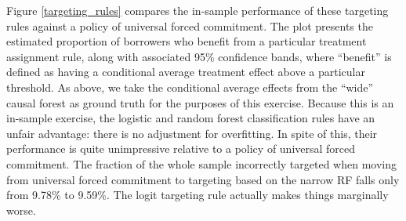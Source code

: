 \begin{figure}[H]

\end{figure}
\vspace{.1in}

Figure \ref{targeting_rules} compares the in-sample performance of these targeting rules against a policy of universal forced commitment. The plot presents the estimated proportion of borrowers who benefit from a particular treatment assignment rule, along with associated 95\% confidence bands, where ``benefit'' is defined as having a conditional average treatment effect above a particular threshold. As above, we take the conditional average effects from the ``wide'' causal forest as ground truth for the purposes of this exercise. Because this is an in-sample exercise, the logistic and random forest classification rules have an unfair advantage: there is no adjustment for overfitting. In spite of this, their performance is quite unimpressive relative to a policy of universal forced commitment. The fraction of the whole sample incorrectly targeted when moving from universal forced commitment to targeting based on the narrow RF falls only from 9.78\% to 9.59\%. The logit targeting rule actually makes things marginally worse. 








